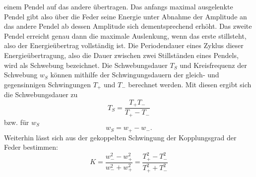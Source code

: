 \begin{itemize}
einem Pendel auf das andere übertragen. Das anfangs maximal ausgelenkte Pendel gibt also über die 
Feder seine Energie unter Abnahme der Amplitude an das andere Pendel ab dessen Amplitude sich 
dementsprechend erhöht. Das zweite Pendel erreicht genau dann die maximale Auslenkung, wenn das 
erste stillsteht, also der Energieübertrag vollständig ist. Die Periodendauer eines Zyklus dieser 
Energieübertragung, also die Dauer zwischen zwei Stillständen eines Pendels, wird als Schwebung 
bezeichnet. \newline
Die Schwebungsdauer $T_S$ und Kreisfrequenz der Schwebung $w_S$ 
können mithilfe der Schwingungsdauern der gleich- und gegensinnigen 
Schwingungen $T_+$ und $T_-$ berechnet werden. Mit diesen ergibt sich die Schwebungsdauer zu
\begin{equation}
    \label{eq:TS}
T_S=\frac{T_+T_-}{T_+-T_-}
\end{equation}
bzw. für $w_S$
\begin{equation}
\label{eq:omegas}
w_S=w_+-w_-.
\end{equation}
Weiterhin lässt sich aus der gekoppelten Schwingung der Kopplungsgrad der Feder bestimmen:
\begin{equation}
    \label{eq:kappa}
K=\frac{w_-^2-w_+^2}{w_-^2+w_+^2}=\frac{T_+^2-T_-^2}{T_+^2+T_-^2}
\end{equation}
\end{itemize}

